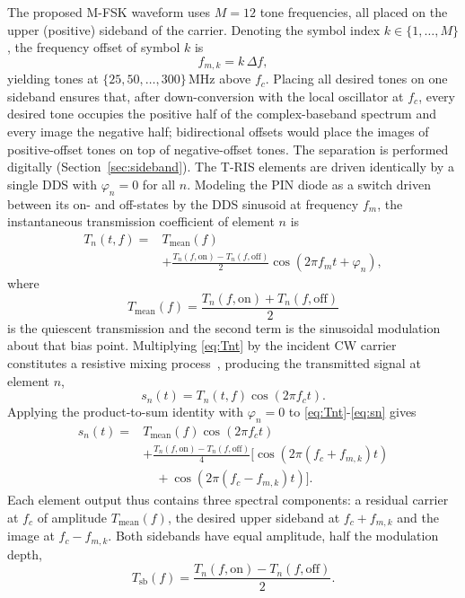 \documentclass[journal]{IEEEtran}
\newcommand{\Tris}{T-RIS}
\begin{document}
The proposed M-FSK waveform uses $M = 12$ tone frequencies, all placed on
the upper (positive) sideband of the carrier. Denoting the symbol index
$k \in \{1,\dots,M\}$, the frequency offset of symbol $k$ is
\begin{equation}
f_{m,k} = k\,\Delta f,
\label{eq:fmk}
\end{equation}
yielding tones at $\{25, 50, \dots, 300\}$\,MHz above $f_c$. Placing all desired tones on one sideband ensures that, after down-conversion with the local oscillator at $f_c$, every desired tone occupies the positive half of the complex-baseband spectrum and every image the negative half; bidirectional offsets would place the images of positive-offset tones on top of negative-offset tones. The separation is performed digitally (Section~\ref{sec:sideband}).
 The \Tris{}
elements are driven identically by a single DDS with $\varphi_n = 0$ for all
$n$. Modeling the PIN diode as a switch driven between its on- and off-states
by the DDS sinusoid at frequency $f_m$, the instantaneous transmission
coefficient of element $n$ is~\cite{zhao2019programmable,song2018beam}
\begin{align}
T_n(t,f) ={}& T_{\mathrm{mean}}(f) \nonumber\\
&+ \frac{T_n(f,\mathrm{on}) - T_n(f,\mathrm{off})}{2}\cos\!\left(2\pi f_m t + \varphi_n\right),
\label{eq:Tnt}
\end{align}
where
\begin{equation}
T_{\mathrm{mean}}(f) = \frac{T_n(f,\mathrm{on}) + T_n(f,\mathrm{off})}{2}
\label{eq:Tmean}
\end{equation}
is the quiescent transmission and the second term is the sinusoidal
modulation about that bias point. Multiplying \eqref{eq:Tnt} by the incident
CW carrier constitutes a resistive mixing process~\cite{zhao2019programmable},
producing the transmitted signal at element $n$,
\begin{equation}
s_n(t) = T_n(t,f)\cos(2\pi f_c t).
\label{eq:sn}
\end{equation}
Applying the product-to-sum identity with $\varphi_n = 0$ to
\eqref{eq:Tnt}-\eqref{eq:sn} gives
\begin{align}
s_n(t) ={}& T_{\mathrm{mean}}(f)\cos(2\pi f_c t) \nonumber\\
&+ \frac{T_n(f,\mathrm{on}) - T_n(f,\mathrm{off})}{4}
\big[\cos(2\pi (f_c + f_{m,k})t) \nonumber\\
&\quad + \cos(2\pi (f_c - f_{m,k})t)\big].
\label{eq:sn_expand}
\end{align}
Each element output thus contains three spectral components: a residual
carrier at $f_c$ of amplitude $T_{\mathrm{mean}}(f)$, the desired upper
sideband at $f_c + f_{m,k}$ and the image at $f_c - f_{m,k}$. Both sidebands
have equal amplitude, half the modulation depth,
\begin{equation}
T_{\mathrm{sb}}(f) = \frac{T_n(f,\mathrm{on}) - T_n(f,\mathrm{off})}{2}.
\label{eq:Tsb}
\end{equation}
\end{document}
